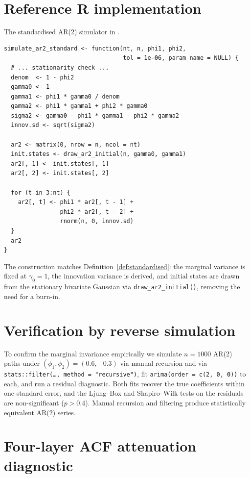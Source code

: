 \documentclass[11pt]{article}
\theoremstyle{definition}
\begin{document}
\section{Reference R implementation}
\label{app:r-code}

The standardised AR(2) simulator in
.

\begin{lstlisting}
simulate_ar2_standard <- function(nt, n, phi1, phi2,
                                  tol = 1e-06, param_name = NULL) {
  # ... stationarity check ...
  denom  <- 1 - phi2
  gamma0 <- 1
  gamma1 <- phi1 * gamma0 / denom
  gamma2 <- phi1 * gamma1 + phi2 * gamma0
  sigma2 <- gamma0 - phi1 * gamma1 - phi2 * gamma2
  innov.sd <- sqrt(sigma2)

  ar2 <- matrix(0, nrow = n, ncol = nt)
  init.states <- draw_ar2_initial(n, gamma0, gamma1)
  ar2[, 1] <- init.states[, 1]
  ar2[, 2] <- init.states[, 2]

  for (t in 3:nt) {
    ar2[, t] <- phi1 * ar2[, t - 1] +
                phi2 * ar2[, t - 2] +
                rnorm(n, 0, innov.sd)
  }
  ar2
}
\end{lstlisting}

The construction matches Definition~\ref{def:standardised}: the
marginal variance is fixed at $\gamma_0 = 1$, the innovation variance
is derived, and initial states are drawn from the stationary bivariate
Gaussian via \texttt{draw\_ar2\_initial()}, removing the need for a
burn-in.

\section{Verification by reverse simulation}
\label{app:verification}

To confirm the marginal invariance empirically we simulate $n = 1000$
AR(2) paths under $(\phi_1, \phi_2) = (0.6, -0.3)$ via manual
recursion and via \texttt{stats::filter(\ldots, method =
"recursive")}, fit \texttt{arima(order = c(2, 0, 0))} to each, and run
a residual diagnostic. Both fits recover the true coefficients within
one standard error, and the Ljung--Box and Shapiro--Wilk tests on the
residuals are non-significant ($p > 0.4$). Manual recursion and
filtering produce statistically equivalent AR(2) series.

\section{Four-layer ACF attenuation diagnostic}
\label{app:acf-diagnostic}
\end{document}
